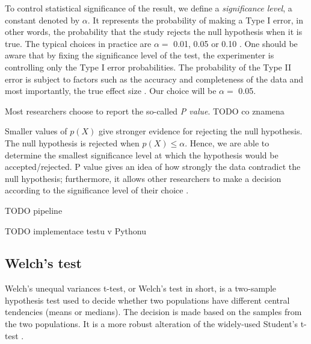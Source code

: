 To control statistical significance of the result, we define a \textit{significance level}, a constant denoted by $\alpha$. It represents the probability  of making a Type I error, in other words, the probability that the study rejects the null hypothesis when it is true. The typical choices in practice are $\alpha =$ 0.01, 0.05 or 0.10 \cite{casella}. One should be aware that by fixing the significance level of the test, the experimenter is controlling only the Type I error probabilities. The probability of the Type II error is subject to factors such as the accuracy and completeness of the data and most importantly, the true effect size \cite{sham_purcell}. Our choice will be $\alpha =$ 0.05.

Most researchers choose to report the so-called \textit{P value}. TODO co znamena

Smaller values of $p(X)$ give stronger evidence for rejecting the null hypothesis. The null hypothesis is rejected when $p(X) \leq \alpha$. Hence, we are able to determine the smallest significance level at which the hypothesis would be accepted/rejected. P value gives an idea of how strongly the data contradict the null hypothesis; furthermore, it allows other researchers to make a decision according to the significance level of their choice \cite{sham_purcell, casella, lehmann}.


TODO pipeline

TODO implementace testu v Pythonu

\subsection{Welch's test}

Welch's unequal variances t-test, or Welch's test in short, is a two-sample hypothesis test used to decide whether two populations have different central tendencies (means or medians). The decision is made based on the samples from the two populations. It is a more robust alteration of the widely-used Student's t-test \cite{welch}.

